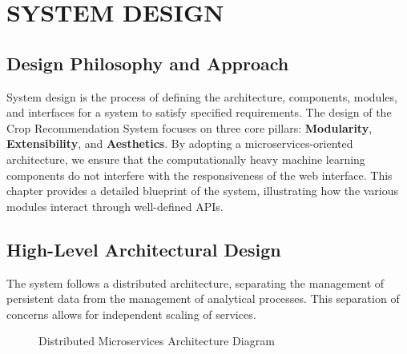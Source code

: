 \documentclass[12pt,a4paper]{report}
\begin{document}
\chapter{SYSTEM DESIGN}
\label{ch:4}

\section{Design Philosophy and Approach}
\label{sec:4.1}
System design is the process of defining the architecture, components, modules, and interfaces for a system to satisfy specified requirements. The design of the Crop Recommendation System focuses on three core pillars: \textbf{Modularity}, \textbf{Extensibility}, and \textbf{Aesthetics}. By adopting a microservices-oriented architecture, we ensure that the computationally heavy machine learning components do not interfere with the responsiveness of the web interface. This chapter provides a detailed blueprint of the system, illustrating how the various modules interact through well-defined APIs.

\section{High-Level Architectural Design}
The system follows a distributed architecture, separating the management of persistent data from the management of analytical processes. This separation of concerns allows for independent scaling of services.

\begin{figure}[H]
    \centering
    \caption{Distributed Microservices Architecture Diagram}
    \label{fig:arch}
\end{figure}
\end{document}
